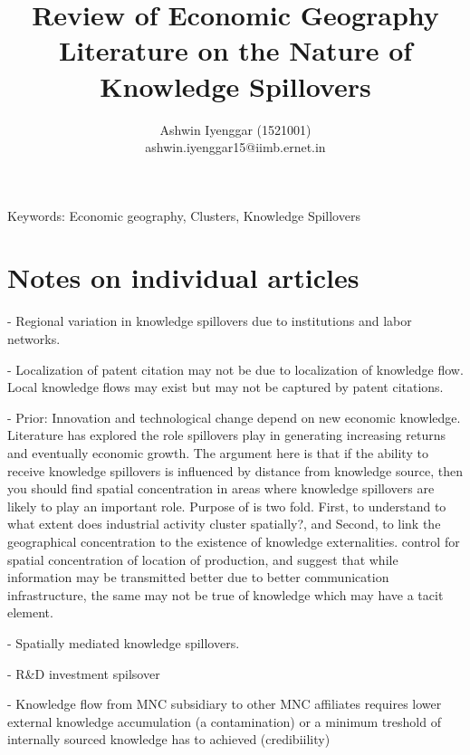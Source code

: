 \documentclass[12pt]{article}
\begin{document}
\title{\LARGE Review of Economic Geography Literature on the Nature of Knowledge Spillovers}

\author{Ashwin Iyenggar  (1521001) \\ ashwin.iyenggar15@iimb.ernet.in} 
\large

\maketitle
\thispagestyle{empty}

\begin{abstract}
\large \noindent 
\end{abstract}
{Keywords:} Economic geography, Clusters, Knowledge Spillovers
\onehalfspacing

\section{Notes on individual articles}
\cite{Almeida1999} - Regional variation in knowledge spillovers due to institutions and labor networks.

\cite*{Arora2017} - Localization of patent citation may not be due to localization of knowledge flow. Local knowledge flows may exist but may not be captured by patent citations.

\cite{Audretsch1996} - Prior: Innovation and technological change depend on new economic knowledge. Literature has explored the role spillovers play in generating increasing returns and eventually economic growth. The argument here is that if the ability to receive knowledge spillovers is influenced by distance from knowledge source, then you should find spatial concentration in areas where knowledge spillovers are likely to play an important role. Purpose of \cite{Audretsch1996} is two fold. First, to understand to what extent does industrial activity cluster spatially?, and Second, to link the geographical concentration to the existence of knowledge externalities. \cite{Audretsch1996} control for spatial concentration of location of production, and suggest that while information may be transmitted better due to better communication infrastructure, the same may not be true of knowledge which may have a tacit element. 

\cite{Jaffe1989} - Spatially mediated knowledge spillovers.

\cite{Zoltan1992, Zoltan1994, Feldman1994a, Feldman1994b} - R\&D investment spilsover

\cite{Asmusses2011} - Knowledge flow from MNC subsidiary to other MNC affiliates requires lower external knowledge accumulation (a contamination) or a minimum treshold of internally sourced knowledge has to achieved (credibiility)
\end{document}
